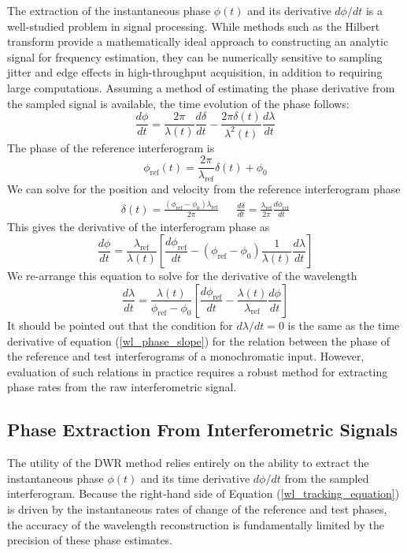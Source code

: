 \documentclass[8pt,a4paper]{report}
\begin{document}
	The extraction of the instantaneous phase $\phi(t)$ and its derivative $d\phi/dt$ is a well-studied problem in signal processing. While methods such as the Hilbert transform provide a mathematically ideal approach to constructing an analytic signal for frequency estimation, they can be numerically sensitive to sampling jitter and edge effects in high-throughput acquisition, in addition to requiring large computations. Assuming a method of estimating the phase derivative from the sampled signal is available, the time evolution of the phase follows:
	\begin{equation}
		\frac{d\phi}{dt} = \frac{2\pi}{\lambda(t)}\frac{d\delta}{dt} - \frac{2\pi \delta(t)}{\lambda^2(t)}\frac{d\lambda}{dt}
	\end{equation}
	The phase of the reference interferogram is
	\begin{equation}
		\phi_\mathrm{ref}(t) = \frac{2\pi}{\lambda_\mathrm{ref}} \delta(t) + \phi_0
	\end{equation}
	We can solve for the position and velocity from the reference interferogram phase
	\begin{align}
		\delta(t) = \frac{\left(\phi_\mathrm{ref}- \phi_0\right) \lambda_\mathrm{ref}}{2\pi} &&
		\frac{d\delta}{dt} = \frac{\lambda_\mathrm{ref}}{2\pi}\frac{d\phi_\mathrm{ref}}{dt}
	\end{align}
	This gives the derivative of the interferogram phase as
	\begin{equation}
		\frac{d\phi}{dt} = \frac{\lambda_\mathrm{ref}}{\lambda(t)}
		\left[
		\frac{d\phi_\mathrm{ref}}{dt} - \left(\phi_\mathrm{ref} - \phi_0\right) \frac{1}{\lambda(t)}\frac{d\lambda}{dt} 
		\right]
	\end{equation}
	We re-arrange this equation to solve for the derivative of the wavelength
	\begin{equation} \label{wl_tracking_equation}
		\frac{d\lambda}{dt} = \frac{\lambda(t)}{\phi_\mathrm{ref} - \phi_0} \left[
		\frac{d\phi_\mathrm{ref}}{dt} - \frac{\lambda(t)}{\lambda_\mathrm{ref}}\frac{d\phi}{dt}
		\right]
	\end{equation}
	It should be pointed out that the condition for $d\lambda / dt = 0$ is the same as the time derivative of equation (\ref{wl_phase_slope}) for the relation between the phase of the reference and test interferograms of a monochromatic input. However, evaluation of such relations in practice requires a robust method for extracting phase rates from the raw interferometric signal.
	
	\subsection{Phase Extraction From Interferometric Signals}
	The utility of the DWR method relies entirely on the ability to extract the instantaneous phase $\phi(t)$ and its time derivative $d\phi/dt$ from the sampled interferogram. Because the right-hand side of Equation (\ref{wl_tracking_equation}) is driven by the instantaneous rates of change of the reference and test phases, the accuracy of the wavelength reconstruction is fundamentally limited by the precision of these phase estimates.
	
\end{document}
